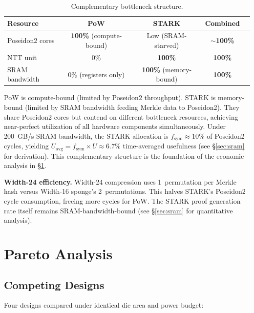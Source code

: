 \documentclass[11pt,a4paper]{article}
\begin{document}
\begin{table}[h]
\centering
\begin{tabular}{@{}lcccc@{}}
\toprule
Resource & PoW & STARK & Combined \\
\midrule
Poseidon2 cores & \textbf{100\%} (compute-bound) & Low (SRAM-starved) & ${\sim}$\textbf{100\%} \\
NTT unit & 0\% & \textbf{100\%} & \textbf{100\%} \\
SRAM bandwidth & 0\% (registers only) & \textbf{100\%} (memory-bound) & \textbf{100\%} \\
\bottomrule
\end{tabular}
\caption{Complementary bottleneck structure.}
\label{tab:bottleneck}
\end{table}

PoW is compute-bound (limited by Poseidon2 throughput). STARK is memory-bound (limited by SRAM bandwidth feeding Merkle data to Poseidon2). They share Poseidon2 cores but contend on different bottleneck resources, achieving near-perfect utilization of all hardware components simultaneously. Under 200~GB/s SRAM bandwidth, the STARK allocation is $f_{\mathrm{sym}} \approx 10\%$ of Poseidon2 cycles, yielding $U_{\mathrm{avg}} = f_{\mathrm{sym}} \times U \approx 6.7\%$ time-averaged usefulness (see \S\ref{sec:sram} for derivation). This complementary structure is the foundation of the economic analysis in \S\ref{sec:pareto}.

\textbf{Width-24 efficiency.} Width-24 compression uses 1~permutation per Merkle hash versus Width-16 sponge's 2~permutations. This halves STARK's Poseidon2 cycle consumption, freeing more cycles for PoW. The STARK proof generation rate itself remains SRAM-bandwidth-bound (see \S\ref{sec:sram} for quantitative analysis).

\section{Pareto Analysis}
\label{sec:pareto}

\subsection{Competing Designs}

Four designs compared under identical die area and power budget:
\end{document}
